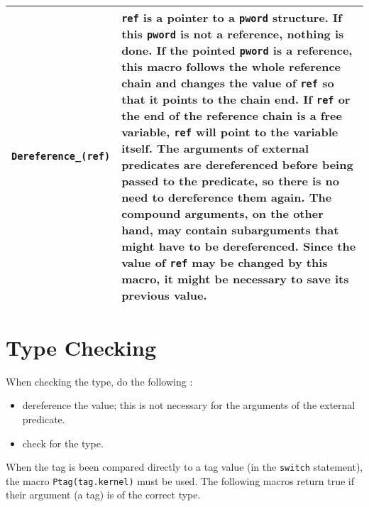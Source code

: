 \noindent
 \\
\begin{tabular}{|p{5cm}p{10cm}|} 
\hline
{\tt Dereference_(ref)} & 
{\tt ref} is a pointer to a {\tt pword} structure.
If this {\tt pword} is not a reference,
nothing is done. If the pointed {\tt pword} is a reference, 
this macro follows 
the whole reference chain and changes the value of {\tt ref}
so that it points to the chain end.
If {\tt ref} or the end of the reference chain is a free variable, 
{\tt ref} will point to the variable itself. The arguments of
external predicates are dereferenced before being passed to the 
predicate, so there is no need to dereference them again.
The compound arguments, on the other hand, may contain
subarguments that might have to be dereferenced.
Since the value of {\tt ref} may be changed by this macro, it might
be necessary to save its previous value. \\
\hline
\end{tabular}

\newpage
\section{Type Checking}
When checking the type, do the following :
\begin{itemize}
\item dereference the value; this is not necessary for the arguments
of the external predicate. 


\item check for the type. 
\end{itemize}
When the tag is been compared directly to a tag value (in the 
{\tt switch} statement), the macro {\tt Ptag(tag.kernel)} must be used.
The following macros return true if their argument (a tag) is of the correct 
type.

